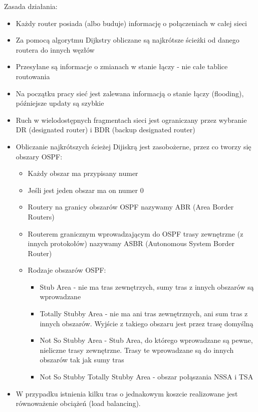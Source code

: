 \documentclass[main.tex]{subfiles}
\begin{document}
    Zasada działania:
    \begin{itemize}
        \item Każdy router posiada (albo buduje) informację o połączeniach w całej sieci
        \item Za pomocą algorytmu Dijkstry obliczane są najkrótsze ścieżki od danego routera do innych węzłów
        \item Przesyłane są informacje o zmianach w stanie łączy - nie całe tablice routowania
        \item Na początku pracy sieć jest zalewana informacją o stanie łączy (flooding), późniejsze updaty są szybkie
        \item Ruch w wielodostępnych fragmentach sieci jest ograniczany przez wybranie DR (designated router) i BDR (backup designated router)
        \item Obliczanie najkrótszych ścieżej Dijiskrą jest zasobożerne, przez co
        tworzy się obszary OSPF:
        \begin{itemize}
            \item Każdy obszar ma przypisany numer
            \item Jeśli jest jeden obszar ma on numer 0
            \item Routery na granicy obszarów OSPF nazywamy ABR (Area Border Routers)
            \item Routerem granicznym wprowadzającym do OSPF trasy zewnętrzne (z innych protokołów) nazywamy ASBR (Autonomous System Border Router)
            \item Rodzaje obszarów OSPF:
            \begin{itemize}
                \item Stub Area - nie ma tras zewnętrzych, sumy tras z innych obszarów są wprowadzane
                \item Totally Stubby Area - nie ma ani tras zewnętrznych, ani sum tras z innych obszarów. Wyjście z takiego obszaru jest przez trasę domyślną
                \item Not So Stubby Area - Stub Area, do którego wprowadzane są pewne, nieliczne trasy zewnętrzne. Trasy te wprowadzane są do innych obszarów tak jak sumy tras
                \item Not So Stubby Totally Stubby Area - obszar połąszania NSSA i TSA
            \end{itemize}
        \end{itemize}
        \item W przypadku istnienia kilku tras o jednakowym koszcie realizowane jest równoważenie obciążeń (load balancing).
    \end{itemize}
\end{document}
